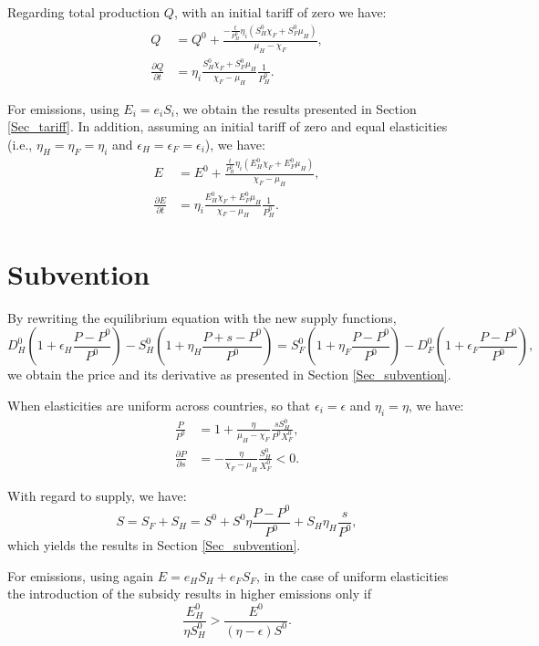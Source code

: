 Regarding total production $Q$, with an initial tariff of zero we have:
\begin{align*}
    Q                             & = Q^0 + \frac{- \frac{t}{P_H^0}\eta_i(S_H^0 \chi_F + S_F^0 \mu_H)}{\mu_H - \chi_F}, \\
    \frac{\partial Q}{\partial t} & = \eta_i \frac{S_H^0 \chi_F + S_F^0 \mu_H}{\chi_F - \mu_H}\frac{1}{P_H^0}.
\end{align*}

For emissions, using $E_i = e_i S_i$, we obtain the results presented in Section \ref{Sec_tariff}. In addition, assuming an initial tariff of zero and equal elasticities (i.e., $\eta_H = \eta_F = \eta_i$ and $\epsilon_H = \epsilon_F = \epsilon_i$), we have:
\begin{align*}
    E                             & = E^0 + \frac{\frac{t}{P_H^0} \eta_i (E_H^0 \chi_F + E_F^0 \mu_H)}{\chi_F - \mu_H}, \\[1mm]
    \frac{\partial E}{\partial t} & = \eta_i \frac{E_H^0 \chi_F + E_F^0 \mu_H}{\chi_F - \mu_H}\frac{1}{P_H^0}.
\end{align*}

\section{Subvention}\label{appendix:intuitions_subvention}

By rewriting the equilibrium equation with the new supply functions,
$$
    D_H^0\left(1+\epsilon_H \frac{P - P^0}{P^0}\right) - S_H^0\left(1+\eta_H \frac{P + s - P^0}{P^0}\right) = S_F^0 \left(1+\eta_F \frac{P - P^0}{P^0}\right) - D_F^0\left(1+\epsilon_F \frac{P - P^0}{P^0}\right),
$$
we obtain the price and its derivative as presented in Section \ref{Sec_subvention}.

When elasticities are uniform across countries, so that $\epsilon_i = \epsilon$ and $\eta_i = \eta$, we have:
\begin{align*}
    \frac{P}{P^0}                 & = 1 + \frac{\eta}{\mu_H - \chi_F} \frac{s S_H^0}{P^0 X_F^0}, \\
    \frac{\partial P}{\partial s} & = -\frac{\eta}{\chi_F - \mu_H} \frac{S_H^0}{X_F^0} < 0.
\end{align*}

With regard to supply, we have:
$$
    S = S_F + S_H =  S^0 + S^0 \eta \frac{P- P^0}{P^0} + S_H \eta_H \frac{s}{P^0},
$$
which yields the results in Section \ref{Sec_subvention}.

For emissions, using again $E = e_H S_H + e_F S_F$, in the case of uniform elasticities the introduction of the subsidy results in higher emissions only if
$$
    \frac{E_H^0}{\eta S_H^0} > \frac{E^0}{(\eta - \epsilon)S^0}.
$$



